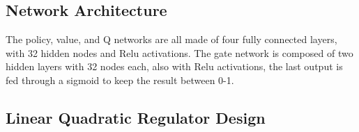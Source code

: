 \documentclass[letterpaper, 10 pt, conference]{ieeeconf}
\begin{document}
\subsection*{Network Architecture}
The policy, value, and Q networks are all made of four fully connected layers, with 32 hidden nodes and Relu activations. The gate network is composed of two hidden layers with 32 nodes each, also with Relu activations, the last output is fed through a sigmoid to keep the result between 0-1.


\subsection{Linear Quadratic Regulator Design}




\addtolength{\textheight}{-12cm}   %
\end{document}
